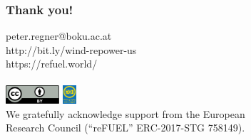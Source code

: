 \documentclass[color=usenames,dvipsnames]{beamer}
\begin{document}
    {
    \begin{frame}[plain]
        \frametitle{Thank you!}
        \vspace{1.5cm}
        peter.regner@boku.ac.at\\
        http://bit.ly/wind-repower-us\\
        https://refuel.world/\\

        \vspace{0.6cm}
        \\

        \vspace{1.6cm}
        \includegraphics[height=0.7cm]{creative-commons-by.pdf}
        \includegraphics[height=0.7cm]{graphic_egu_photo_yes.png}\\
        \smallskip
        \small{We gratefully acknowledge support from the European\\
        Research Council (“reFUEL” ERC-2017-STG 758149).}
    \end{frame}
    }
\end{document}
